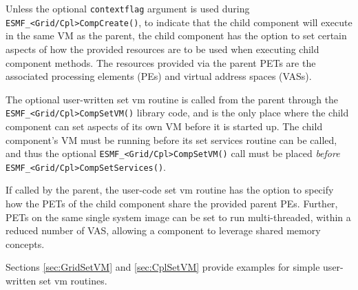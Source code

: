 Unless the optional {\tt contextflag} argument is used during 
{\tt ESMF\_<Grid/Cpl>CompCreate()}, to indicate that the child component will
execute in the same VM as the parent, the child component has the option
to set certain aspects of how the provided resources are to be used when
executing child component methods. The resources provided via the parent PETs
are the associated processing elements (PEs) and virtual address spaces (VASs).

The optional user-written set vm routine is called from the parent
through the {\tt ESMF\_<Grid/Cpl>CompSetVM()} library code, and is the only
place where the child component can set aspects of its own VM before it is 
started up. The child component's VM must be running before its set services
routine can be called, and thus the optional {\tt ESMF\_<Grid/Cpl>CompSetVM()}
call must be placed {\em before} {\tt ESMF\_<Grid/Cpl>CompSetServices()}.

If called by the parent, the user-code set vm routine has the option to
specify how the PETs of the child component share the provided parent PEs.
Further, PETs on the same single system image can be set to run multi-threaded,
within a reduced number of VAS, allowing a component to leverage shared memory
concepts.

Sections \ref{sec:GridSetVM} and \ref{sec:CplSetVM} provide examples for
simple user-written set vm routines.
